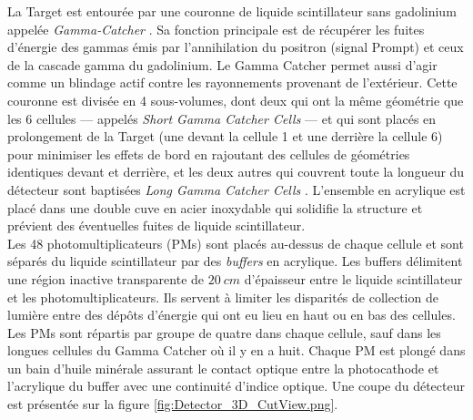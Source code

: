 La Target est entourée par une couronne de liquide scintillateur sans gadolinium appelée \og \textit{Gamma-Catcher} \fg{}. Sa fonction principale est de récupérer les fuites d'énergie des gammas émis par l'annihilation du positron (signal Prompt) et ceux de la cascade gamma du gadolinium. Le Gamma Catcher permet aussi d'agir comme un blindage actif contre les rayonnements provenant de l'extérieur. Cette couronne est divisée en 4 sous-volumes, dont deux qui ont la même géométrie que les 6 cellules --- appelés \og \textit{Short Gamma Catcher Cells} \fg{} --- et qui sont placés en prolongement de la Target (une devant la cellule 1 et une derrière la cellule 6) pour minimiser les effets de bord en rajoutant des cellules de géométries identiques devant et derrière, et les deux autres qui couvrent toute la longueur du détecteur sont baptisées \og \textit{Long Gamma Catcher Cells} \fg{}. L'ensemble en acrylique est placé dans une double cuve en acier inoxydable qui solidifie la structure et prévient des éventuelles fuites de liquide scintillateur.\\ 

Les 48 photomultiplicateurs (PMs) sont placés au-dessus de chaque cellule et sont séparés du liquide scintillateur par des \og \textit{buffers} \fg{} en acrylique. Les buffers délimitent une région inactive transparente de $\SI{20}{cm}$ d'épaisseur entre le liquide scintillateur et les photomultiplicateurs. Ils servent à limiter les disparités de collection de lumière entre des dépôts d'énergie qui ont eu lieu en haut ou en bas des cellules. Les PMs sont répartis par groupe de quatre dans chaque cellule, sauf dans les longues cellules du Gamma Catcher où il y en a huit. Chaque PM est plongé dans un bain d'huile minérale assurant le contact optique entre la photocathode et l'acrylique du buffer avec une continuité d'indice optique. Une coupe du détecteur est présentée sur la figure \ref{fig:Detector_3D_CutView.png}.\\ 


